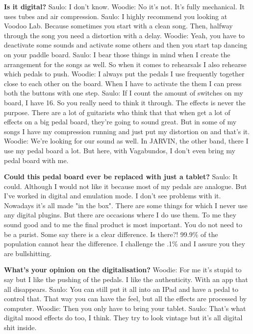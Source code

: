\textbf{Is it digital?}
\newline Saulo: I don't know.
\newline Woodie: No it's not. It's fully mechanical. It uses tubes and air compression.
\newline Saulo: I highly recommend you looking at Voodoo Lab. Because sometimes you start with a clean song. Then, halfway through the song you need a distortion with a delay.
\newline Woodie: Yeah, you have to deactivate some sounds and activate some others and then you start tap dancing on your paddle board.
\newline Saulo: I bear those things in mind when I create the arrangement for the songs as well. So when it comes to rehearsals I also rehearse which pedals to push.
\newline Woodie: I always put the pedals I use frequently together close to each other on the board. When I have to activate the them I can press both the buttons with one step.
\newline Saulo: If I count the amount of switches on my board, I have 16. So you really need to think it through. The effects is never the purpose.
There are a lot of guitarists who think that that when get a lot of effects on a big pedal board, they're going to sound great.
But in some of my songs I have my compression running and just put my distortion on and that's it.
\newline Woodie: We're looking for our sound as well. In JARVIN, the other band, there I use my pedal board a lot. But here, with Vagabundos, I don't even bring my pedal board with me.

\textbf{Could this pedal board ever be replaced with just a tablet?}
\newline Saulo: It could. Although I would not like it because most of my pedals are analogue. But I've worked in digital and emulation mode. I don't see problems with it.
Nowadays it's all made "in the box". There are some things for which I never use any digital plugins. But there are occasions where I do use them.
To me they sound good and to me the final product is most important. You do not need to be a purist. Some say there is a clear difference. Is there?!
99.9\% of the population cannot hear the difference. I challenge the .1\% and I assure you they are bullshitting.

\textbf{What's your opinion on the digitalisation?}
\newline Woodie: For me it's stupid to say but I like the pushing of the pedals. I like the authenticity. With an app that all disappears.
\newline Saulo: You can still put it all into an IPad and have a pedal to control that. That way you can have the feel, but all the effects are processed by computer.
\newline Woodie: Then you only have to bring your tablet.
\newline Saulo: That's what digital mood effects do too, I think. They try to look vintage but it's all digital shit inside.

